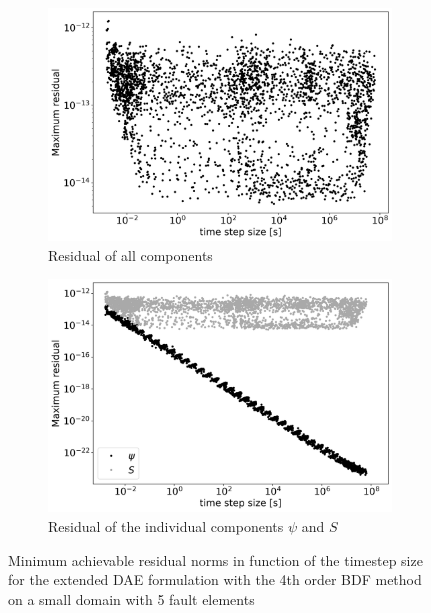 \begin{figure}[H]
	\centering
	\begin{subfigure}[t]{0.45\textwidth}
	\centering
		\includegraphics[width=1\textwidth]{images/TANDEMConvergenceAnalysisExtendedDAEMaxResidual_Size5.png}
		\caption{Residual of all components}
		\label{fig:convergenceIssuesExtendedDAEMaxResidual_vs_dt}
	\end{subfigure} 
	\begin{subfigure}[t]{0.45\textwidth}
		\centering
		\includegraphics[width=1\textwidth]{images/TANDEMConvergenceAnalysisExtendedDAEMaxResidual_Size5_onlyPSI.png}
		\caption{Residual of the individual components $\psi$ and $S$}
		\label{fig:convergenceIssuesExtendedDAEMaxResidual_vs_dt_onlyPSI}
	\end{subfigure} 
	\caption{Minimum achievable residual norms in function of the timestep size for the extended DAE formulation with the 4th order BDF method on a small domain with 5 fault elements}
\end{figure}


